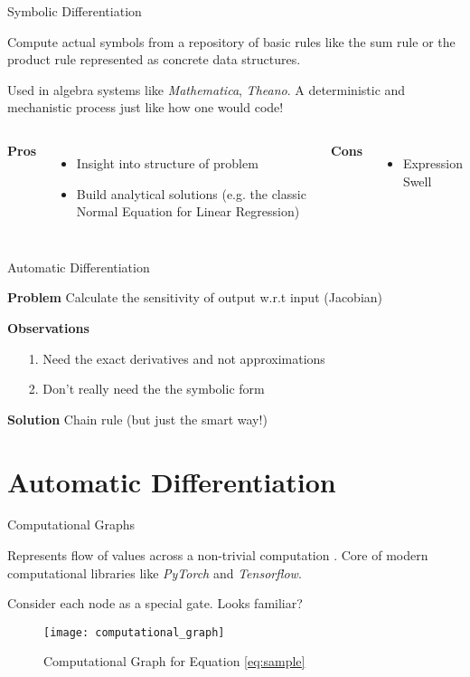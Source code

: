 \documentclass{beamer}
\begin{document}
\begin{frame}{Symbolic Differentiation}

Compute actual symbols from a repository of basic rules like the sum rule or the product
rule represented as concrete data structures.

Used in algebra systems like \textit{Mathematica}, \textit{Theano}. A deterministic and 
mechanistic process just like how one would code!

\begin{columns}[T,onlytextwidth]
      \textbf{Pros}
      \begin{itemize}
		\item Insight into structure of problem
		\item Build analytical solutions (e.g. the classic Normal Equation for Linear Regression)
      \end{itemize}

      \textbf{Cons}
      \begin{itemize}
        \item Expression Swell
      \end{itemize}
\end{columns}
\end{frame}

\begin{frame}{Automatic Differentiation}

\textbf{Problem}
Calculate the sensitivity of output w.r.t input (Jacobian)

\textbf{Observations}
\begin{itemize}
\item[1.] Need the exact derivatives and not approximations
\item[2.] Don't really need the the symbolic form
\end{itemize}

\textbf{Solution} Chain rule (but just the smart way!)

\end{frame}

\section{Automatic Differentiation}

\begin{frame}{Computational Graphs}

Represents flow of values across a non-trivial computation \cite{Bauer1974}. Core of modern computational
libraries like \textit{PyTorch} and \textit{Tensorflow}.

Consider each node as a special gate. Looks familiar?

\begin{figure}[H]
\caption{Computational Graph for Equation \ref{eq:sample}}
\texttt{[image: computational\_graph]}
\centering
\label{img:computational_graph}
\end{figure}

\end{frame}
\end{document}
